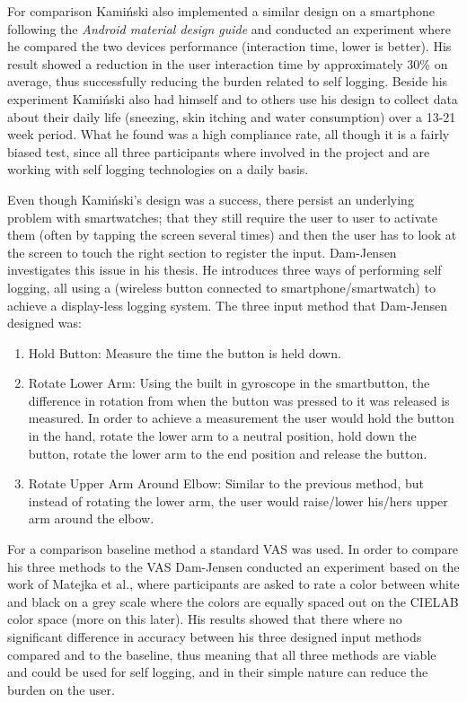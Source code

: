 For comparison Kami\'nski also implemented a similar design on a smartphone following the \emph{Android material design guide}\cite{android_design} and conducted an experiment where he compared the two devices performance (interaction time, lower is better). His result showed a reduction in the user interaction time by approximately 30\% on average, thus successfully reducing the burden related to self logging. Beside his experiment Kami\'nski also had himself and to others use his design to collect data about their daily life (sneezing, skin itching and water consumption) over a 13-21 week period. What he found was a high compliance rate, all though it is a fairly biased test, since all three participants where involved in the project and are working with self logging technologies on a daily basis. 

Even though Kami\'nski's design was a success, there persist an underlying problem with smartwatches; that they still require the user to user to activate them (often by tapping the screen several times) and then the user has to look at the screen to touch the right section to register the input. Dam-Jensen\cite{dam} investigates this issue in his thesis. He introduces three ways of performing self logging, all using a  (wireless button connected to smartphone/smartwatch) to achieve a display-less logging system. The three input method that Dam-Jensen designed was:

\begin{enumerate}
	\item Hold Button: Measure the time the button is held down.
	\item Rotate Lower Arm: Using the built in gyroscope in the smartbutton, the difference in rotation from when the button was pressed to it was released is measured. In order to achieve a measurement the user would hold the button in the hand, rotate the lower arm to a neutral position, hold down the button, rotate the lower arm to the end position and release the button. 
	\item Rotate Upper Arm Around Elbow: Similar to the previous method, but instead of rotating the lower arm, the user would raise/lower his/hers upper arm around the elbow.
\end{enumerate}

For a comparison baseline method a standard VAS was used. In order to compare his three methods to the VAS Dam-Jensen conducted an experiment based on the work of Matejka et al.\cite{grey}, where participants are asked to rate a color between white and black on a grey scale where the colors are equally spaced out on the CIELAB color space\cite{cielab} (more on this later). His results showed that there where no significant difference in accuracy between his three designed input methods compared and to the baseline, thus meaning that all three methods are viable and could be used for self logging, and in their simple nature can reduce the burden on the user.








